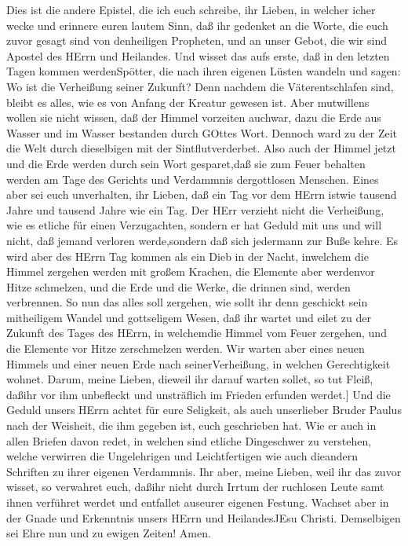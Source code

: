  Dies ist die andere Epistel, die ich euch schreibe, ihr
Lieben, in welcher icher wecke und erinnere euren lautem Sinn,
 daß ihr gedenket an die Worte, die euch zuvor gesagt sind
von denheiligen Propheten, und an unser Gebot, die wir sind Apostel des
HErrn und Heilandes.  Und wisset das aufs erste, daß in den
letzten Tagen kommen werdenSpötter, die nach ihren eigenen Lüsten
wandeln  und sagen: Wo ist die Verheißung seiner Zukunft?
Denn nachdem die Väterentschlafen sind, bleibt es alles, wie es von
Anfang der Kreatur gewesen ist.  Aber mutwillens wollen sie
nicht wissen, daß der Himmel vorzeiten auchwar, dazu die Erde aus Wasser
und im Wasser bestanden durch GOttes Wort.  Dennoch ward zu
der Zeit die Welt durch dieselbigen mit der Sintflutverderbet.
 Also auch der Himmel jetzt und die Erde werden durch sein
Wort gesparet,daß sie zum Feuer behalten werden am Tage des Gerichts und
Verdammnis dergottlosen Menschen.  Eines aber sei euch
unverhalten, ihr Lieben, daß ein Tag vor dem HErrn istwie tausend Jahre
und tausend Jahre wie ein Tag.  Der HErr verzieht nicht die
Verheißung, wie es etliche für einen Verzugachten, sondern er hat Geduld
mit uns und will nicht, daß jemand verloren werde,sondern daß sich
jedermann zur Buße kehre.  Es wird aber des HErrn Tag
kommen als ein Dieb in der Nacht, inwelchem die Himmel zergehen werden
mit großem Krachen, die Elemente aber werdenvor Hitze schmelzen, und die
Erde und die Werke, die drinnen sind, werden verbrennen. 
So nun das alles soll zergehen, wie sollt ihr denn geschickt sein
mitheiligem Wandel und gottseligem Wesen,  daß ihr wartet
und eilet zu der Zukunft des Tages des HErrn, in welchemdie Himmel vom
Feuer zergehen, und die Elemente vor Hitze zerschmelzen werden.
 Wir warten aber eines neuen Himmels und einer neuen Erde
nach seinerVerheißung, in welchen Gerechtigkeit wohnet. 
Darum, meine Lieben, dieweil ihr darauf warten sollet, so tut Fleiß,
daßihr vor ihm unbefleckt und unsträflich im Frieden erfunden werdet.{]}
 Und die Geduld unsers HErrn achtet für eure Seligkeit, als
auch unserlieber Bruder Paulus nach der Weisheit, die ihm gegeben ist,
euch geschrieben hat.  Wie er auch in allen Briefen davon
redet, in welchen sind etliche Dingeschwer zu verstehen, welche
verwirren die Ungelehrigen und Leichtfertigen wie auch dieandern
Schriften zu ihrer eigenen Verdammnis.  Ihr aber, meine
Lieben, weil ihr das zuvor wisset, so verwahret euch, daßihr nicht durch
Irrtum der ruchlosen Leute samt ihnen verführet werdet und entfallet
auseurer eigenen Festung.  Wachset aber in der Gnade und
Erkenntnis unsers HErrn und HeilandesJEsu Christi. Demselbigen sei Ehre
nun und zu ewigen Zeiten! Amen.
